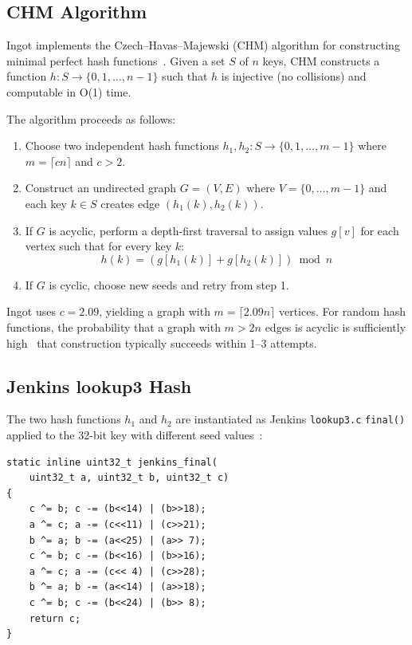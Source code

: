 \documentclass[10pt,twocolumn,letterpaper]{article}
\begin{document}
\subsection{CHM Algorithm}

Ingot implements the Czech--Havas--Majewski (CHM) algorithm for
constructing minimal perfect hash functions~\cite{chm-1992,
chm-family-1996}.  Given a set $S$ of $n$ keys, CHM constructs a
function $h: S \rightarrow \{0, 1, \ldots, n-1\}$ such that $h$ is
injective (no collisions) and computable in O(1) time.

The algorithm proceeds as follows:

\begin{enumerate}
    \item Choose two independent hash functions $h_1, h_2: S
        \rightarrow \{0, 1, \ldots, m-1\}$ where $m = \lceil cn
        \rceil$ and $c > 2$.
    \item Construct an undirected graph $G = (V, E)$ where $V =
        \{0, \ldots, m-1\}$ and each key $k \in S$ creates edge
        $(h_1(k), h_2(k))$.
    \item If $G$ is acyclic, perform a depth-first traversal to assign
        values $g[v]$ for each vertex such that for every key $k$:
        \begin{equation}
        h(k) = (g[h_1(k)] + g[h_2(k)]) \bmod n
        \label{eq:chm}
        \end{equation}
    \item If $G$ is cyclic, choose new seeds and retry from step 1.
\end{enumerate}

Ingot uses $c = 2.09$, yielding a graph with $m = \lceil 2.09n
\rceil$ vertices.  For random hash functions, the probability that a
graph with $m > 2n$ edges is acyclic is sufficiently
high~\cite{chm-survey-1997} that construction typically succeeds
within 1--3 attempts.

\subsection{Jenkins lookup3 Hash}

The two hash functions $h_1$ and $h_2$ are instantiated as Jenkins
\texttt{lookup3.c} \texttt{final()} applied to the 32-bit key with
different seed values~\cite{jenkins-hash}:

\begin{lstlisting}
static inline uint32_t jenkins_final(
    uint32_t a, uint32_t b, uint32_t c)
{
    c ^= b; c -= (b<<14) | (b>>18);
    a ^= c; a -= (c<<11) | (c>>21);
    b ^= a; b -= (a<<25) | (a>> 7);
    c ^= b; c -= (b<<16) | (b>>16);
    a ^= c; a -= (c<< 4) | (c>>28);
    b ^= a; b -= (a<<14) | (a>>18);
    c ^= b; c -= (b<<24) | (b>> 8);
    return c;
}
\end{lstlisting}
\end{document}
